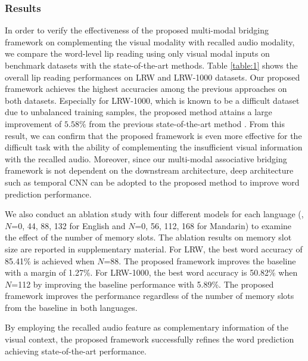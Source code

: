 \documentclass[10pt,twocolumn,letterpaper]{article}
\begin{document}
\vspace{-0.3cm}
\subsubsection{Results}
In order to verify the effectiveness of the proposed multi-modal bridging framework on complementing the visual modality with recalled audio modality, we compare the word-level lip reading using only visual modal inputs on benchmark datasets with the state-of-the-art methods. 
Table \ref{table:1} shows the overall lip reading performances on LRW and LRW-1000 datasets. Our proposed framework achieves the highest accuracies among the previous approaches on both datasets. Especially for LRW-1000, which is known to be a difficult dataset due to unbalanced training samples, the proposed method attains a large improvement of $5.58\%$ from the previous state-of-the-art method \cite{zhang2020cutout}. From this result, we can confirm that the proposed framework is even more effective for the difficult task with the ability of complementing the insufficient visual information with the recalled audio. Moreover, since our multi-modal associative bridging framework is not dependent on the downstream architecture, deep architecture such as temporal CNN can be adopted to the proposed method to improve word prediction performance.

We also conduct an ablation study with four different models for each language (\ie, $N$=0, 44, 88, 132 for English and $N$=0, 56, 112, 168 for Mandarin) to examine the effect of the number of memory slots. The ablation results on memory slot size are reported in supplementary material. For LRW, the best word accuracy of 85.41\% is achieved when $N$=88. The proposed framework improves the baseline with a margin of 1.27\%. For LRW-1000, the best word accuracy is 50.82\% when $N$=112 by improving the baseline performance with 5.89\%. 
The proposed framework improves the performance regardless of the number of memory slots from the baseline in both languages.

By employing the recalled audio feature as complementary information of the visual context, the proposed framework successfully refines the word prediction achieving state-of-the-art performance.
\end{document}
